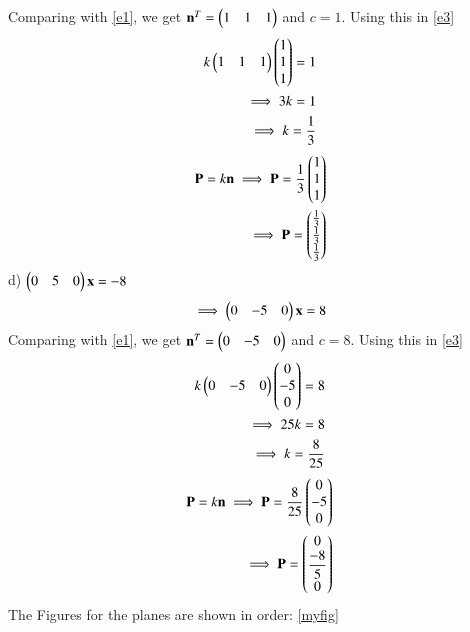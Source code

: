 \documentclass[journal,12pt,twocolumn]{IEEEtran}
\begin{document}
Comparing with \eqref{e1}, we get $\mathbf{n}^T = \begin{pmatrix}1&1&1\end{pmatrix}$ and  $c=1$. Using this in \eqref{e3}
\begin{align}
	k\begin{pmatrix}1&1&1\end{pmatrix}\begin{pmatrix}1\\1\\1\end{pmatrix} = 1\\
	\implies 3k = 1\\
	\implies k = \frac{1}{3}
\end{align}
\begin{align}
	\mathbf{P} = k\mathbf{n}
	\implies\mathbf{P} = \frac{1}{3}\begin{pmatrix}1\\1\\1\end{pmatrix}\\
	\implies\mathbf{P}= \begin{pmatrix}\frac{1}{3}\\\frac{1}{3}\\\frac{1}{3}\end{pmatrix}
\end{align}
d) $\begin{pmatrix}0&5&0\end{pmatrix}\mathbf{x} = -8$
\begin{align}
    \nonumber\implies\begin{pmatrix}0&-5&0\end{pmatrix}\mathbf{x} = 8
\end{align}
Comparing with \eqref{e1}, we get $\mathbf{n}^T = \begin{pmatrix}0&-5&0\end{pmatrix}$ and  $c=8$. Using this in \eqref{e3}
\begin{align}
	k\begin{pmatrix}0&-5&0\end{pmatrix}\begin{pmatrix}0\\-5\\0\end{pmatrix} = 8\\
	\implies 25k = 8\\
	\implies k = \frac{8}{25}
\end{align}
\begin{align}
	\mathbf{P} = k\mathbf{n}
	\implies\mathbf{P} = \frac{8}{25}\begin{pmatrix}0\\-5\\0\end{pmatrix}\\
	\implies\mathbf{P}= \begin{pmatrix}0\\\dfrac{-8}{5}\\0\end{pmatrix}
\end{align}
The Figures for the planes are shown in order:
\ref{myfig}
\renewcommand{\thefigure}{a}
\end{document}
